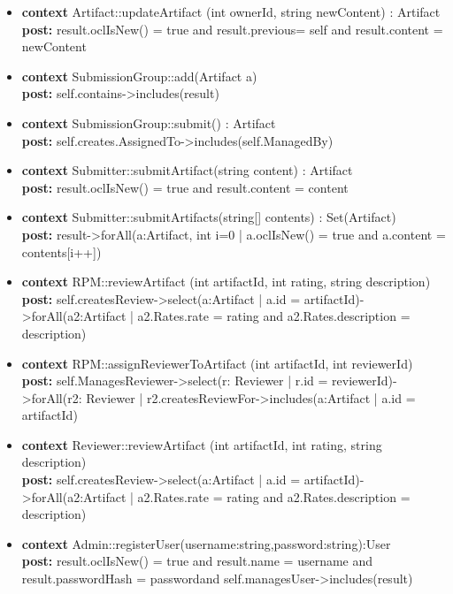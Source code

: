 \begin{itemize}
\item \textbf{context} Artifact::updateArtifact (int ownerId, string newContent) : Artifact
\\
\textbf{post:} result.oclIsNew() = true and result.previous= self and result.content = newContent


\item \textbf{context} SubmissionGroup::add(Artifact a)
\\
\textbf{post:} self.contains->includes(result) 

\item \textbf{context} SubmissionGroup::submit() : Artifact
\\
\textbf{post:} self.creates.AssignedTo->includes(self.ManagedBy)

\item \textbf{context} Submitter::submitArtifact(string content) : Artifact
\\
\textbf{post:} result.oclIsNew() = true and result.content = content


\item \textbf{context} Submitter::submitArtifacts(string[] contents) : Set(Artifact)
\\
\textbf{post:} result->forAll(a:Artifact, int i=0 | a.oclIsNew() = true and a.content = contents[i++])


\item \textbf{context} RPM::reviewArtifact (int artifactId, int rating, string description)
\\
\textbf{post:} self.createsReview->select(a:Artifact | a.id = artifactId)->forAll(a2:Artifact | a2.Rates.rate = rating and a2.Rates.description = description)


\item \textbf{context} RPM::assignReviewerToArtifact (int artifactId, int reviewerId)
\\
\textbf{post:} self.ManagesReviewer->select(r: Reviewer | r.id = reviewerId)->forAll(r2: Reviewer | r2.createsReviewFor->includes(a:Artifact | a.id = artifactId)


\item \textbf{context} Reviewer::reviewArtifact (int artifactId, int rating, string description) 
\\
\textbf{post:} self.createsReview->select(a:Artifact | a.id = artifactId)->forAll(a2:Artifact | a2.Rates.rate = rating and a2.Rates.description = description)


\item \textbf{context} Admin::registerUser(username:string,password:string):User
\\
\textbf{post:} result.oclIsNew() = true and result.name = username and result.passwordHash = passwordand self.managesUser->includes(result)





\end{itemize}
